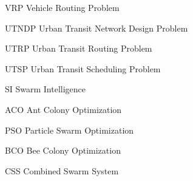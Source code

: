 \begin{abbrv}
\item[VRP] Vehicle Routing Problem
\item[UTNDP] Urban Transit Network Design Problem
\item[UTRP] Urban Transit Routing Problem
\item[UTSP] Urban Transit Scheduling Problem
\item[SI] Swarm Intelligence
\item[ACO] Ant Colony Optimization
\item[PSO] Particle Swarm Optimization
\item[BCO] Bee Colony Optimization
\item[CSS] Combined Swarm System
\end{abbrv}
 
 

 
 
 
 
